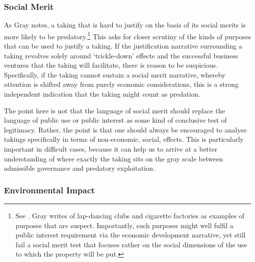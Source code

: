 \subsubsection*{Social Merit}

As Gray notes, a taking that is hard to justify on the basis of its social merits is more likely to be predatory.\footnote{See \cite[34]{gray11}. Gray writes of lap-dancing clubs and cigarette factories as examples of purposes that are suspect. Importantly, such purposes might well fulfil a public interest requirement via the economic development narrative, yet still fail a social merit test that focuses rather on the social dimensions of the use to which the property will be put.} This asks for closer scrutiny of the kinds of purposes that can be used to justify a taking. If the justification narrative surrounding a taking revolves solely around `trickle-down' effects and the successful business ventures that the taking will facilitate, there is reason to be suspicious. Specifically, if the taking cannot sustain a social merit narrative, whereby attention is shifted away from purely economic considerations, this is a strong independent indication that the taking might count as predation.

The point here is not that the language of social merit should replace the language of public use or public interest as some kind of conclusive test of legitimacy. Rather, the point is that one should always be encouraged to analyse takings specifically in terms of non-economic, social, effects. This is particularly important in difficult cases, because it can help us to arrive at a better understanding of where exactly the taking sits on the gray scale between admissible governance and predatory exploitation. 


\subsubsection*{Environmental Impact}

